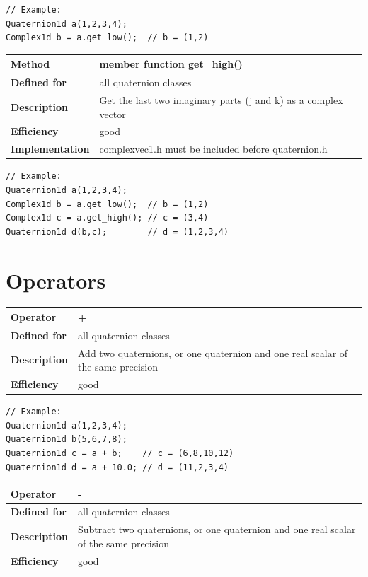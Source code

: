 \documentclass[11pt,a4paper,oneside,openright]{report}
\newcommand{\vspacesmall}{\vspace{3mm}}
\newcommand{\vspacebig}{\vspace{6mm}}
\begin{document}
\begin{lstlisting}[frame=none]
// Example:
Quaternion1d a(1,2,3,4);
Complex1d b = a.get_low();  // b = (1,2)
\end{lstlisting}
\vspacebig


\begin{tabular}{|p{25mm}|p{100mm}|}
\hline
\bfseries Method & member function get\_high() \\ \hline
\bfseries Defined for & all quaternion classes \\ \hline
\bfseries Description & Get the last two imaginary parts (j and k) as a complex vector \\ \hline
\bfseries Efficiency & good \\ \hline
\bfseries Implementation & complexvec1.h must be included before quaternion.h \\ \hline
\end{tabular}
\vspacesmall

\begin{lstlisting}[frame=none]
// Example:
Quaternion1d a(1,2,3,4);
Complex1d b = a.get_low();  // b = (1,2)
Complex1d c = a.get_high(); // c = (3,4)
Quaternion1d d(b,c);        // d = (1,2,3,4)
\end{lstlisting}
\vspacebig



\chapter{Operators}\label{chap:Operators}

\begin{tabular}{|p{25mm}|p{100mm}|}
\hline
\bfseries Operator & + \\ \hline
\bfseries Defined for & all quaternion classes  \\ \hline
\bfseries Description & Add two quaternions, or one quaternion and one real scalar of the same precision \\ \hline
\bfseries Efficiency & good \\ \hline
\end{tabular}
\vspacesmall

\begin{lstlisting}[frame=none]
// Example:
Quaternion1d a(1,2,3,4);
Quaternion1d b(5,6,7,8);
Quaternion1d c = a + b;    // c = (6,8,10,12)
Quaternion1d d = a + 10.0; // d = (11,2,3,4)
\end{lstlisting}
\vspacebig


\begin{tabular}{|p{25mm}|p{100mm}|}
\hline
\bfseries Operator & - \\ \hline
\bfseries Defined for & all quaternion classes  \\ \hline
\bfseries Description & Subtract two quaternions, or one quaternion and one real scalar of the same precision \\ \hline
\bfseries Efficiency & good \\ \hline
\end{tabular}
\vspacesmall
\end{document}
